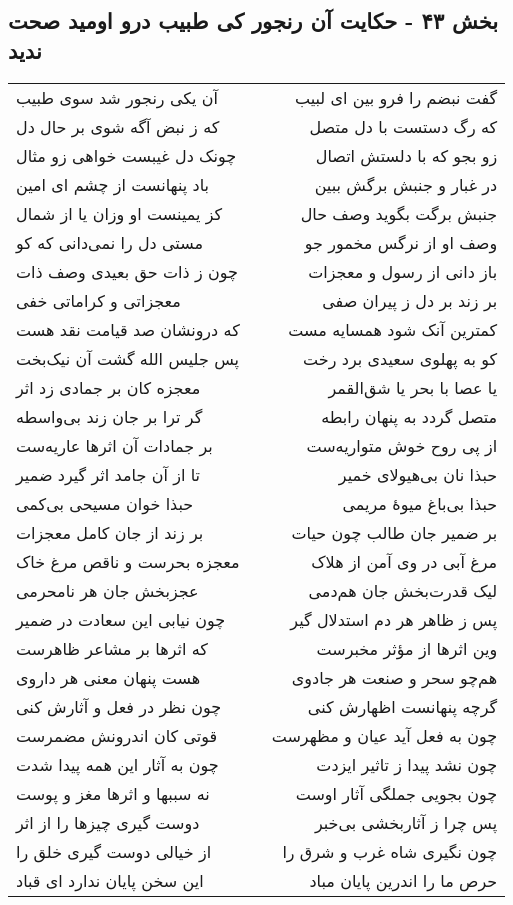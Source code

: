\begin{center}
\section*{بخش ۴۳ - حکایت آن رنجور کی طبیب درو اومید صحت ندید}
\label{sec:sh043}
\begin{longtable}{l p{0.5cm} r}
آن یکی رنجور شد سوی طبیب
&&
گفت نبضم را فرو بین ای لبیب
\\
که ز نبض آگه شوی بر حال دل
&&
که رگ دستست با دل متصل
\\
چونک دل غیبست خواهی زو مثال
&&
زو بجو که با دلستش اتصال
\\
باد پنهانست از چشم ای امین
&&
در غبار و جنبش برگش ببین
\\
کز یمینست او وزان یا از شمال
&&
جنبش برگت بگوید وصف حال
\\
مستی دل را نمی‌دانی که کو
&&
وصف او از نرگس مخمور جو
\\
چون ز ذات حق بعیدی وصف ذات
&&
باز دانی از رسول و معجزات
\\
معجزاتی و کراماتی خفی
&&
بر زند بر دل ز پیران صفی
\\
که درونشان صد قیامت نقد هست
&&
کمترین آنک شود همسایه مست
\\
پس جلیس الله گشت آن نیک‌بخت
&&
کو به پهلوی سعیدی برد رخت
\\
معجزه کان بر جمادی زد اثر
&&
یا عصا با بحر یا شق‌القمر
\\
گر ترا بر جان زند بی‌واسطه
&&
متصل گردد به پنهان رابطه
\\
بر جمادات آن اثرها عاریه‌ست
&&
از پی روح خوش متواریه‌ست
\\
تا از آن جامد اثر گیرد ضمیر
&&
حبذا نان بی‌هیولای خمیر
\\
حبذا خوان مسیحی بی‌کمی
&&
حبذا بی‌باغ میوهٔ مریمی
\\
بر زند از جان کامل معجزات
&&
بر ضمیر جان طالب چون حیات
\\
معجزه بحرست و ناقص مرغ خاک
&&
مرغ آبی در وی آمن از هلاک
\\
عجزبخش جان هر نامحرمی
&&
لیک قدرت‌بخش جان هم‌دمی
\\
چون نیابی این سعادت در ضمیر
&&
پس ز ظاهر هر دم استدلال گیر
\\
که اثرها بر مشاعر ظاهرست
&&
وین اثرها از مؤثر مخبرست
\\
هست پنهان معنی هر داروی
&&
هم‌چو سحر و صنعت هر جادوی
\\
چون نظر در فعل و آثارش کنی
&&
گرچه پنهانست اظهارش کنی
\\
قوتی کان اندرونش مضمرست
&&
چون به فعل آید عیان و مظهرست
\\
چون به آثار این همه پیدا شدت
&&
چون نشد پیدا ز تاثیر ایزدت
\\
نه سببها و اثرها مغز و پوست
&&
چون بجویی جملگی آثار اوست
\\
دوست گیری چیزها را از اثر
&&
پس چرا ز آثاربخشی بی‌خبر
\\
از خیالی دوست گیری خلق را
&&
چون نگیری شاه غرب و شرق را
\\
این سخن پایان ندارد ای قباد
&&
حرص ما را اندرین پایان مباد
\\
\end{longtable}
\end{center}
